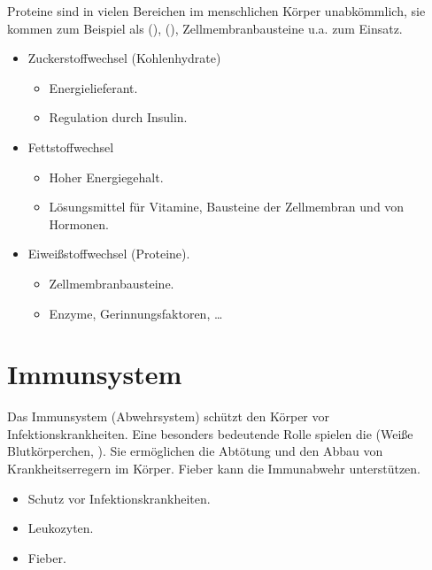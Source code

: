 {Proteine sind in vielen Bereichen im menschlichen Körper unabkömmlich, sie
kommen zum Beispiel als  (), 
(), Zellmembranbausteine u.a. zum Einsatz.
}{
\begin{itemize}
  \item Zuckerstoffwechsel (Kohlenhydrate)
  \begin{itemize}
    \item Energielieferant.
    \item Regulation durch Insulin.
  \end{itemize}
  \item Fettstoffwechsel 
  \begin{itemize}
    \item Hoher Energiegehalt.
    \item Lösungsmittel für Vitamine, Bausteine der Zellmembran und von
    Hormonen.
  \end{itemize}
  \item Eiweißstoffwechsel (Proteine).
  \begin{itemize}
    \item Zellmembranbausteine.
    \item Enzyme, Gerinnungsfaktoren, \ldots
  \end{itemize}
\end{itemize}
}{}{}{}




\cite{AlbertsMolZellbiologie2,LoefflerBiochemie7}


\section{Immunsystem}
\label{topic:immunsystem}

{
Das Immunsystem (Abwehrsystem) schützt den Körper vor Infektionskrankheiten.
Eine besonders bedeutende Rolle spielen die  (Weiße
Blutkörperchen, ). Sie ermöglichen die Abtötung und
den Abbau von Krankheitserregern im Körper. Fieber kann die Immunabwehr
unterstützen. 
}{
\begin{itemize}
  \item Schutz vor Infektionskrankheiten.
  \item Leukozyten.
  \item Fieber.
\end{itemize}
}{}{}{}


